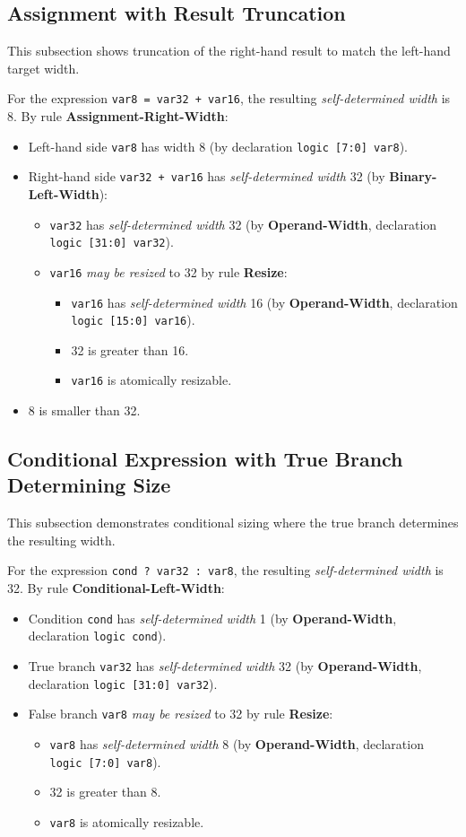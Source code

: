 \documentclass{article}
\newcommand{\sv}[1]{\texttt{#1}}
\newcommand{\sds}{\emph{self-determined width}}
\newcommand{\mbr}{\emph{may be resized}}
\begin{document}
\subsection{Assignment with Result Truncation}

This subsection shows truncation of the right-hand result to match
the left-hand target width.

For the expression \sv{var8 = var32 + var16}, the resulting
\sds{} is 8. By rule \textbf{Assignment-Right-Width}:
\begin{itemize}
  \item Left-hand side \sv{var8} has width 8 (by
    declaration \sv{logic [7:0] var8}).
  \item Right-hand side \sv{var32 + var16} has \sds{} 32
    (by \textbf{Binary-Left-Width}):
    \begin{itemize}
      \item \sv{var32} has \sds{} 32 (by
        \textbf{Operand-Width}, declaration
        \sv{logic [31:0] var32}).
      \item \sv{var16} \mbr{} to 32 by rule \textbf{Resize}:
        \begin{itemize}
          \item \sv{var16} has \sds{} 16 (by
            \textbf{Operand-Width}, declaration
            \sv{logic [15:0] var16}).
          \item 32 is greater than 16.
          \item \sv{var16} is atomically resizable.
        \end{itemize}
    \end{itemize}
  \item 8 is smaller than 32.
\end{itemize}

\subsection{Conditional Expression with True Branch Determining Size}

This subsection demonstrates conditional sizing where the true
branch determines the resulting width.

For the expression \sv{cond ? var32 : var8}, the resulting \sds{} is
32. By rule \textbf{Conditional-Left-Width}:
\begin{itemize}
  \item Condition \sv{cond} has \sds{} 1 (by
    \textbf{Operand-Width}, declaration \sv{logic cond}).
  \item True branch \sv{var32} has \sds{} 32 (by
    \textbf{Operand-Width}, declaration \sv{logic [31:0] var32}).
  \item False branch \sv{var8} \mbr{} to 32 by rule \textbf{Resize}:
    \begin{itemize}
      \item \sv{var8} has \sds{} 8 (by
        \textbf{Operand-Width}, declaration \sv{logic [7:0] var8}).
      \item 32 is greater than 8.
      \item \sv{var8} is atomically resizable.
    \end{itemize}
\end{itemize}
\end{document}
